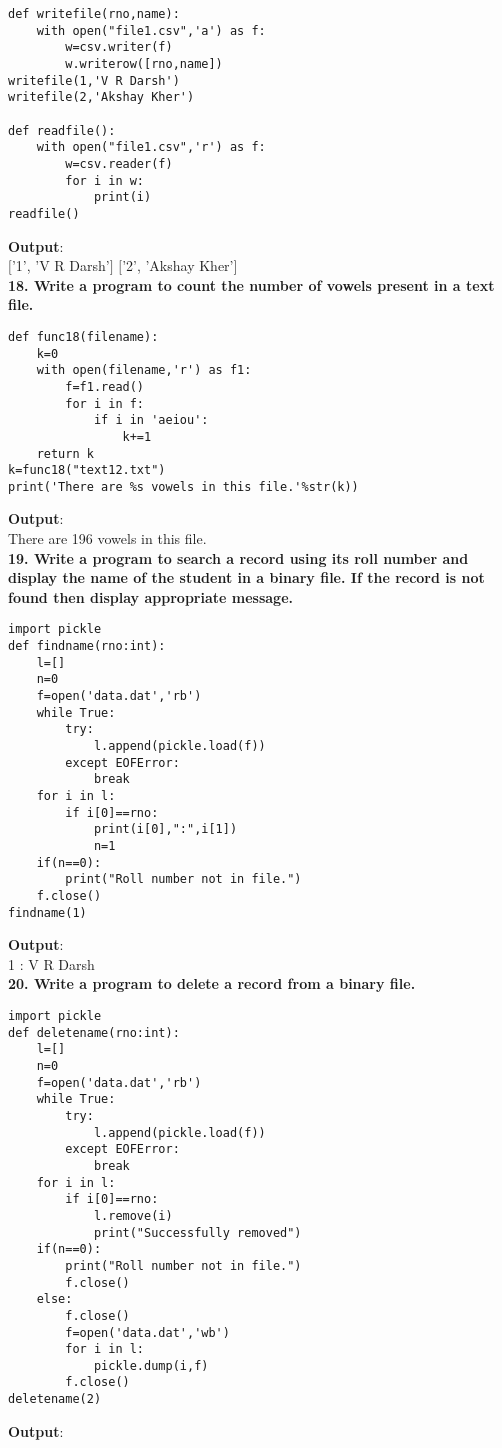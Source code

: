 \documentclass[
a4paper]{article}
\begin{document}
\begin{large}
\begin{verbatim}
def writefile(rno,name):
    with open("file1.csv",'a') as f:
        w=csv.writer(f)
        w.writerow([rno,name])
writefile(1,'V R Darsh')
writefile(2,'Akshay Kher')

def readfile():
    with open("file1.csv",'r') as f:
        w=csv.reader(f)
        for i in w:
            print(i)
readfile()
\end{verbatim}
\textbf{Output}:\\
$[$'1', 'V R Darsh'$]$
$[$'2', 'Akshay Kher'$]$
\\\textbf{18. Write a program to count the number of vowels present in a text file.}
\begin{verbatim}
def func18(filename):
    k=0
    with open(filename,'r') as f1:
        f=f1.read()
        for i in f:
            if i in 'aeiou':
                k+=1
    return k
k=func18("text12.txt")
print('There are %s vowels in this file.'%str(k))
\end{verbatim}
\textbf{Output}:\\
There are 196 vowels in this file.
\\\textbf{19. Write a program to search a record using its roll number and display the name of the student in a binary file. If the record is not found then display appropriate message.}
\begin{verbatim}
import pickle
def findname(rno:int):
    l=[]
    n=0
    f=open('data.dat','rb')
    while True:
        try:
            l.append(pickle.load(f))
        except EOFError:
            break
    for i in l:
        if i[0]==rno:
            print(i[0],":",i[1])
            n=1
    if(n==0):
        print("Roll number not in file.")
    f.close()
findname(1)
\end{verbatim}
\textbf{Output}:\\
1 : V R Darsh
\\\textbf{20. Write a program to delete a record from a binary file.}
\begin{verbatim}
import pickle
def deletename(rno:int):
    l=[]
    n=0
    f=open('data.dat','rb')
    while True:
        try:
            l.append(pickle.load(f))
        except EOFError:
            break
    for i in l:
        if i[0]==rno:
            l.remove(i)
            print("Successfully removed")
    if(n==0):
        print("Roll number not in file.")
        f.close()
    else:
        f.close()
        f=open('data.dat','wb')
        for i in l:
            pickle.dump(i,f)
        f.close()
deletename(2)
\end{verbatim}
\textbf{Output}:\\

\end{large}
\end{document}
